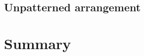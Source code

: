 \subsection{Unpatterned arrangement} \label{sec:unpatterned}



\section{Summary} \label{sec:res_summary}












